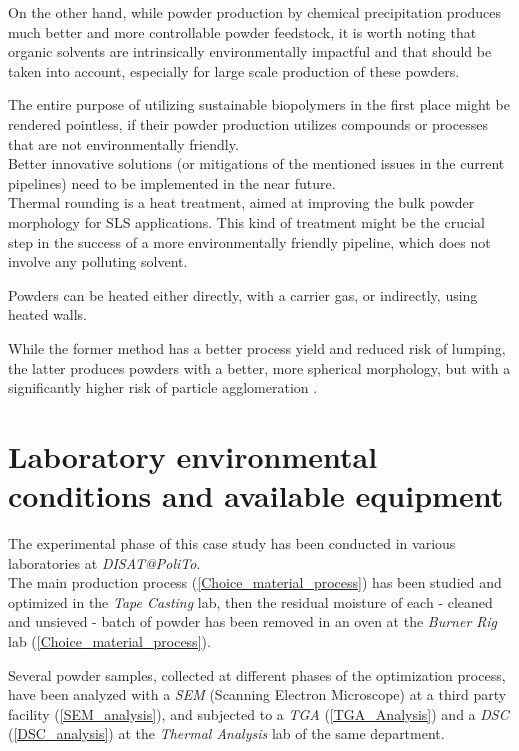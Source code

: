 \documentclass{article}
\begin{document}
    On the other hand, while powder production by 
    chemical precipitation produces much better and more 
    controllable powder feedstock, it is worth noting that organic solvents are intrinsically environmentally impactful and that should be taken 
    into account, especially for large scale production of these powders. 

    The entire purpose of utilizing sustainable biopolymers in the first place might be rendered pointless, if their powder production 
    utilizes compounds or processes that are not environmentally friendly. \\ 

    Better innovative solutions (or mitigations of the mentioned issues in the current pipelines) need to be implemented in the near future. \\ 

    Thermal rounding is a heat treatment, aimed at improving the bulk powder morphology for SLS applications. 
    This kind of treatment might be the crucial step in the success of a more environmentally friendly pipeline, which does not involve 
    any polluting solvent.

    Powders can be heated either directly, with a carrier gas, or indirectly, using heated walls. 

    While the former method has a better process yield and reduced risk of lumping, the latter produces powders with 
    a better, more spherical morphology, but with a significantly higher risk of particle agglomeration \autocite{Dechet_Schmidt_thermal_rounding}.

    \clearpage

    \section{Laboratory environmental conditions and available equipment\label{Lab_condition_equipment}}

    The experimental phase of this case study has been conducted in various laboratories at \textit{DISAT@PoliTo}. \\ 

    The main production process (\ref{Choice_material_process}) has been studied and optimized in 
    the \textit{Tape Casting} lab, then the residual moisture of each - cleaned and 
    unsieved - batch of powder has been removed in an oven at the \textit{Burner Rig} lab (\ref{Choice_material_process}).

    Several powder samples, collected at different phases of the optimization process, have been analyzed 
    with a \textit{SEM} (Scanning Electron Microscope) at a third party 
    facility (\ref{SEM_analysis}), and subjected to 
    a \textit{TGA} (\ref{TGA_Analysis}) and a \textit{DSC} (\ref{DSC_analysis}) 
    at the \textit{Thermal Analysis} lab of the same department. \\ 
    
\end{document}
